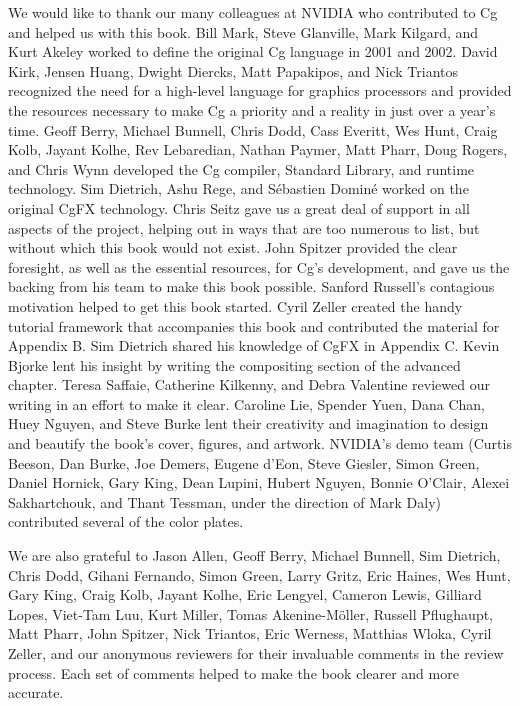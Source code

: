 \documentclass{book}
\begin{document}
We would like to thank our many colleagues at NVIDIA who contributed to Cg and helped us with this book. Bill Mark, Steve Glanville, Mark Kilgard, and Kurt Akeley worked to define the original Cg language in 2001 and 2002. David Kirk, Jensen Huang, Dwight Diercks, Matt Papakipos, and Nick Triantos recognized the need for a high-level language for graphics processors and provided the resources necessary to make Cg a priority and a reality in just over a year's time. Geoff Berry, Michael Bunnell, Chris Dodd, Cass Everitt, Wes Hunt, Craig Kolb, Jayant Kolhe, Rev Lebaredian, Nathan Paymer, Matt Pharr, Doug Rogers, and Chris Wynn developed the Cg compiler, Standard Library, and runtime technology. Sim Dietrich, Ashu Rege, and Sébastien Dominé worked on the original CgFX technology. Chris Seitz gave us a great deal of support in all aspects of the project, helping out in ways that are too numerous to list, but without which this book would not exist. John Spitzer provided the clear foresight, as well as the essential resources, for Cg's development, and gave us the backing from his team to make this book possible. Sanford Russell's contagious motivation helped to get this book started. Cyril Zeller created the handy tutorial framework that accompanies this book and contributed the material for Appendix B. Sim Dietrich shared his knowledge of CgFX in Appendix C. Kevin Bjorke lent his insight by writing the compositing section of the advanced chapter. Teresa Saffaie, Catherine Kilkenny, and Debra Valentine reviewed our writing in an effort to make it clear. Caroline Lie, Spender Yuen, Dana Chan, Huey Nguyen, and Steve Burke lent their creativity and imagination to design and beautify the book's cover, figures, and artwork. NVIDIA's demo team (Curtis Beeson, Dan Burke, Joe Demers, Eugene d'Eon, Steve Giesler, Simon Green, Daniel Hornick, Gary King, Dean Lupini, Hubert Nguyen, Bonnie O'Clair, Alexei Sakhartchouk, and Thant Tessman, under the direction of Mark Daly) contributed several of the color plates.

We are also grateful to Jason Allen, Geoff Berry, Michael Bunnell, Sim Dietrich, Chris Dodd, Gihani Fernando, Simon Green, Larry Gritz, Eric Haines, Wes Hunt, Gary King, Craig Kolb, Jayant Kolhe, Eric Lengyel, Cameron Lewis, Gilliard Lopes, Viet-Tam Luu, Kurt Miller, Tomas Akenine-Möller, Russell Pflughaupt, Matt Pharr, John Spitzer, Nick Triantos, Eric Werness, Matthias Wloka, Cyril Zeller, and our anonymous reviewers for their invaluable comments in the review process. Each set of comments helped to make the book clearer and more accurate.
\end{document}
